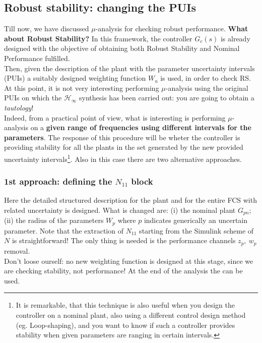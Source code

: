 \documentclass[a4paper, 12pt]{article}
\begin{document}
\subsection{Robust stability: changing the PUIs}
Till now, we have discussed $\mu$-analysis for checking robust performance. \textbf{What about Robust Stability?}
In this framework, the controller $G_c(s)$ is already designed with the objective of obtaining both Robust Stability and Nominal Performance fulfilled. \\
Then, given the description of the plant with the parameter uncertainty intervals (PUIs) a suitably designed weighting function $W_u$ is used, in order to check RS. At this point, it is not very interesting performing $\mu$-analysis using the original PUIs on which the $\mathcal{H}_\infty$ synthesis has been carried out: you are going to obtain a \textit{tautology}!\\

\noindent
Indeed, from a practical point of view, what is interesting is performing $\mu$-analysis on a \textbf{given range of frequencies using different intervals for the parameters}. The response of this procedure will be wheter the controller  is providing stability   for all the plants in the set generated by the new provided uncertainty intervals\footnote{
    It is remarkable, that this technique is also useful when you design the controller on a nominal plant, also using a different control design method (eg. Loop-shaping), and you want to know if such a controller provides stability when given parameters are ranging in certain intervals.
}. Also in this case there are two alternative approaches. 

\subsubsection{1st approach: defining the $N_{11}$ block}
Here the detailed structured description for the plant and for the entire FCS with related uncertainty is designed. What is changed are: (i) the nominal plant $G_{pn}$; (ii) the radius of the  parameters $W_{p}$ where $p$ indicates generically an uncertain parameter. Note that the extraction of $N_{11}$ starting from the Simulink scheme of $N$ is straightforward! The only thing is needed is the performance channels $z_p,\ w_p$ removal. \\
Don't loose ourself: no new weighting function is designed at this stage, since we are checking stability, not performance! At the end of the analysis the  can be used.
\end{document}
